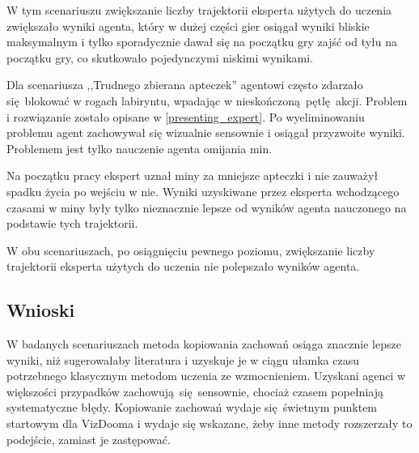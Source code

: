 W tym scenariuszu zwiększanie liczby trajektorii eksperta użytych do uczenia zwiększało wyniki agenta, który w dużej części gier osiągał wyniki bliskie maksymalnym i tylko sporadycznie dawał się na początku gry zajść od tyłu na początku gry, co skutkowało pojedynczymi niskimi wynikami.

Dla scenariusza ,,Trudnego zbierana apteczek'' agentowi często zdarzało się blokować w rogach labiryntu, wpadając w nieskończoną pętlę akcji. Problem i rozwiązanie zostało opisane w \ref{presenting_expert}. Po wyeliminowaniu problemu agent zachowywał się wizualnie sensownie i osiągał przyzwoite wyniki. Problemem jest tylko nauczenie agenta omijania min.

Na początku pracy ekspert uznał miny za mniejsze apteczki i nie zauważył spadku życia po wejściu w nie. Wyniki uzyskiwane przez eksperta wchodzącego czasami w miny były tylko nieznacznie lepsze od wyników agenta nauczonego na podstawie tych trajektorii.

W obu scenariuszach, po osiągnięciu pewnego poziomu, zwiększanie liczby trajektorii eksperta użytych do uczenia nie polepszało wyników agenta. 

\subsection{Wnioski}
W badanych scenariuszach metoda kopiowania zachowań osiąga znacznie lepsze wyniki, niż sugerowałaby literatura i uzyskuje je w ciągu ułamka czasu potrzebnego klasycznym metodom uczenia ze wzmocnieniem. Uzyskani agenci w większości przypadków zachowują się sensownie, chociaż czasem popełniają systematyczne błędy. Kopiowanie zachowań wydaje się świetnym punktem startowym dla VizDooma i wydaje się wskazane, żeby inne metody rozszerzały to podejście, zamiast je zastępować.
